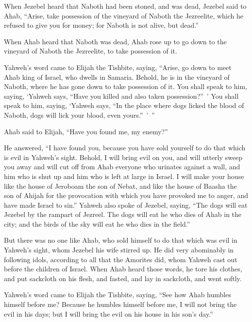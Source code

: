 {\par }{\PP {}When Jezebel heard that Naboth had been stoned, and was dead, Jezebel said to Ahab, “Arise, take possession of the vineyard of Naboth the Jezreelite, which he refused to give you for money; for Naboth is not alive, but dead.”
\par }{\PP {}When Ahab heard that Naboth was dead, Ahab rose up to go down to the vineyard of Naboth the Jezreelite, to take possession of it.
\par }{\PP {}Yahweh’s word came to Elijah the Tishbite, saying,
“Arise, go down to meet Ahab king of Israel, who dwells in Samaria. Behold, he is in the vineyard of Naboth, where he has gone down to take possession of it.
You shall speak to him, saying, ‘Yahweh says, “Have you killed and also taken possession?” ’ You shall speak to him, saying, ‘Yahweh says, “In the place where dogs licked the blood of Naboth, dogs will lick your blood, even yours.” ’ ”
\par }{\PP {}Ahab said to Elijah, “Have you found me, my enemy?”
\par }{\PP He answered, “I have found you, because you have sold yourself to do that which is evil in Yahweh’s sight.
Behold, I will bring evil on you, and will utterly sweep you away and will cut off from Ahab everyone who urinates against a wall, and him who is shut up and him who is left at large in Israel.
I will make your house like the house of Jeroboam the son of Nebat, and like the house of Baasha the son of Ahijah for the provocation with which you have provoked me to anger, and have made Israel to sin.”
Yahweh also spoke of Jezebel, saying, “The dogs will eat Jezebel by the rampart of Jezreel.
The dogs will eat he who dies of Ahab in the city; and the birds of the sky will eat he who dies in the field.”
\par }{\PP {}But there was no one like Ahab, who sold himself to do that which was evil in Yahweh’s sight, whom Jezebel his wife stirred up.
He did very abominably in following idols, according to all that the Amorites did, whom Yahweh cast out before the children of Israel.
When Ahab heard those words, he tore his clothes, and put sackcloth on his flesh, and fasted, and lay in sackcloth, and went softly.
\par }{\PP {}Yahweh’s word came to Elijah the Tishbite, saying,
“See how Ahab humbles himself before me? Because he humbles himself before me, I will not bring the evil in his days; but I will bring the evil on his house in his son’s day.”

}
